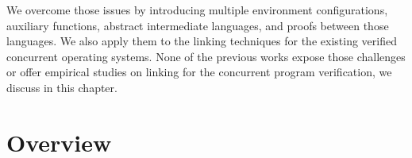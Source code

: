 We overcome those issues by introducing multiple environment configurations, auxiliary functions, abstract intermediate languages,
and proofs between those languages.
We also apply them to the linking techniques for the existing verified concurrent operating systems. 
None of the previous works expose those challenges or offer empirical studies on linking for the concurrent program verification,
 we discuss in this chapter.


\section{Overview}
\label{chapter:conlink:sec:overview}



